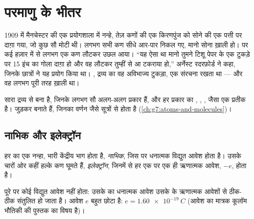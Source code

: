 \chapter{परमाणु के भीतर}\label{ch:g9:inside-the-atom}

1909 में मैनचेस्टर की एक प्रयोगशाला में नन्हे, तेज़ कणों की एक किरणपुंज को
सोने की एक पत्ती पर दाग़ा गया, जो कुछ सौ  मोटी थी। लगभग सभी कण सीधे
आर-पार निकल गए, मानो सोना ख़ाली हो। पर कई हज़ार में से लगभग एक कण लौटकर
उछल आया। ``यह ऐसा था मानो तुमने टिशू पेपर के एक टुकड़े पर 15 इंच का गोला
दाग़ा हो और वह लौटकर तुम्हीं से आ टकराया हो,'' अर्नेस्ट रदरफ़ोर्ड ने कहा,
जिनके छात्रों ने यह प्रयोग किया था। , द्रव्य का वह अविभाज्य टुकड़ा, एक
संरचना रखता था --- और वह लगभग पूरी तरह
ख़ाली था।

\begin{recall}
सारा द्रव्य  से बना है, जिनके लगभग सौ अलग-अलग प्रकार हैं, और हर
प्रकार का , , ,  जैसा एक प्रतीक है।  जुड़कर
 बनाते हैं, जिनका वर्णन  जैसे सूत्रों से होता है
(\cref{ch:g7:atoms-and-molecules})।
\end{recall}

\section{नाभिक और इलेक्ट्रॉन}

\begin{definition}[नाभिक और इलेक्ट्रॉन]\label{def:g9:inside-the-atom:nucleus}
हर  का एक नन्हा, भारी केंद्रीय भाग होता है, \emph{नाभिक},
जिस पर धनात्मक विद्युत आवेश होता है। उसके चारों ओर कहीं हल्के कण घूमते हैं,
\emph{इलेक्ट्रॉन}, जिनमें से हर एक पर एक ही
ऋणात्मक आवेश, $-e$, होता है।
\end{definition}

\begin{proposition}[परमाणु उदासीन होता है]\label{prop:g9:inside-the-atom:neutral}
पूरे  पर कोई विद्युत आवेश नहीं होता: उसके  का धनात्मक आवेश
उसके  के ऋणात्मक आवेशों से ठीक-ठीक संतुलित हो जाता है।
आवेश $e$ बहुत छोटा है: $e = \qty{1.60e-19}{C}$ (आवेश का मात्रक कूलॉम
भौतिकी की पुस्तक का विषय है)।
\end{proposition}


